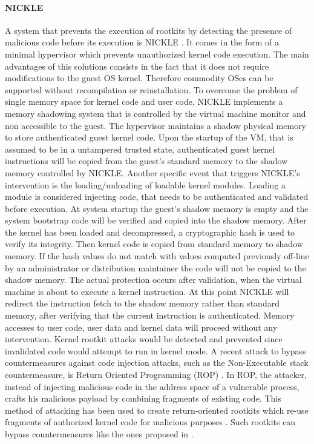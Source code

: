 \paragraph{NICKLE}
A system that prevents the execution of rootkits by detecting the presence of malicious code before its execution is NICKLE \cite{NICKLE}. It comes in the form of a minimal hypervisor which prevents unauthorized kernel code execution. The main advantages of this solutions consists in the fact that it does not require modifications to the guest OS kernel. Therefore commodity OSes can be supported without recompilation or reinstallation. 
To overcome the problem of single memory space for kernel code and user code, NICKLE implements a memory shadowing system that is controlled by the virtual machine monitor and non accessible to the guest. 
The hypervisor maintains a shadow physical memory to store authenticated guest kernel code. Upon the startup of the VM, that is assumed to be in a untampered trusted state, authenticated guest kernel instructions will be copied from the guest's standard memory to the shadow memory controlled by NICKLE. Another specific event that triggers NICKLE's intervention is the loading/unloading of loadable kernel modules. Loading a module is  considered injecting code, that needs to be authenticated and validated before execution. 
At system startup the guest's shadow memory is empty and the system bootstrap code will be verified and copied into the shadow memory. After the kernel has been loaded and decompressed, a cryptographic hash is used to verify its integrity. Then kernel code is copied from standard memory to shadow memory. If the hash values do not match with values computed previously off-line by an administrator or distribution maintainer the code will not be copied to the shadow memory.
The actual protection occurs after validation, when the virtual machine is about to execute a kernel instruction. At this point NICKLE will redirect the instruction fetch to the shadow memory rather than standard memory, after verifying that the current instruction is authenticated. 
Memory accesses to user code, user data and kernel data will proceed without any intervention. 
Kernel rootkit attacks would be detected and prevented since invalidated code would attempt to run in kernel mode.   
A recent attack to bypass countermeasures against code injection attacks, such as the Non-Executable stack countermeasure, is Return Oriented Programming (ROP) \cite{geometry}. In ROP, the attacker, instead of injecting malicious code in the address space of a vulnerable process, crafts his malicious payload by combining fragments of existing code. This method of attacking has been used to create return-oriented rootkits which
re-use fragments of authorized kernel code for malicious purposes \cite{Hund2009}. 
Such rootkits can bypass countermeasures like the ones proposed in \cite{NICKLE, SecVisor}.


